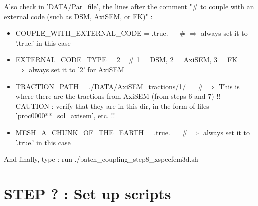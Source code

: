 \documentclass[11pt]{article}
\begin{document}
\medskip

\noindent Also check in 'DATA/Par\_file', the lines after the comment "\# to couple with an external code (such as DSM, AxiSEM, or FK)" :

\begin{itemize}

\item[\textbullet] COUPLE\_WITH\_EXTERNAL\_CODE = .true. ~~ \# $\Longrightarrow$ always set it to '.true.' in this case

\item[\textbullet] EXTERNAL\_CODE\_TYPE = 2  ~ \# 1 = DSM, 2 = AxiSEM, 3 = FK ~~ $\Longrightarrow$ always set it to '2' for AxiSEM

\item[\textbullet] TRACTION\_PATH  = ./DATA/AxiSEM\_tractions/1/ ~~   \# $\Longrightarrow$ This is where there are the tractions from AxiSEM (from steps 6 and 7) !! CAUTION : verify that they are in this dir, in the form of files 'proc0000**\_sol\_axisem', etc. !!

\item[\textbullet] MESH\_A\_CHUNK\_OF\_THE\_EARTH  = .true.  ~~  \# $\Longrightarrow$ always set it to '.true.' in this case

\end{itemize}

\medskip

\noindent And finally, type : run ./batch\_coupling\_step8\_xspecfem3d.sh

\section{STEP ? : Set up scripts}
\end{document}
